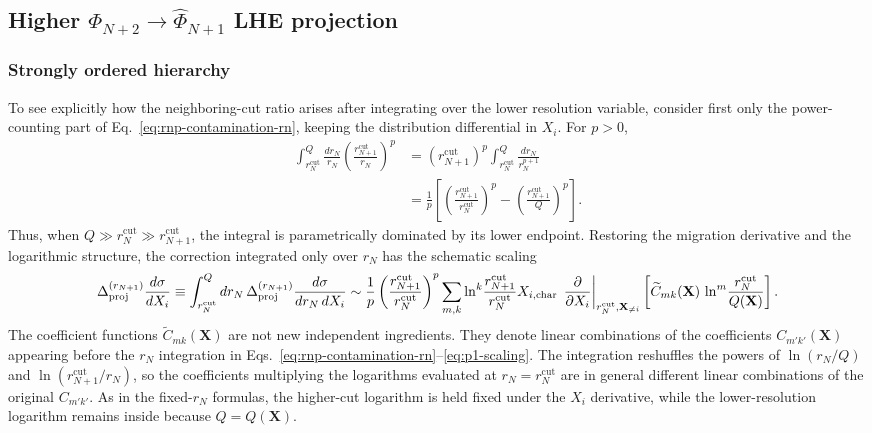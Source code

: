 \documentclass[11pt]{article}
\newcommand{\rn}{r_N}
\newcommand{\rnp}{r_{N+1}}
\newcommand{\cut}{\mathrm{cut}}
\newcommand{\Ph}{\Phi}
\begin{document}
\subsection{Higher $\Ph_{N+2}\to\widehat\Ph_{N+1}$ LHE projection}
\label{subsec:higher-projection-nnlo}

\subsubsection{Strongly ordered hierarchy}

To see explicitly how the neighboring-cut ratio arises after integrating over the lower resolution variable,
consider first only the power-counting part of Eq.~\eqref{eq:rnp-contamination-rn}, keeping the distribution
differential in \(X_i\). For \(p>0\),
\begin{align}
\int_{\rn^{\cut}}^Q
\frac{d\rn}{\rn}
\left(\frac{\rnp^{\cut}}{\rn}\right)^p
&=
(\rnp^{\cut})^p
\int_{\rn^{\cut}}^Q
\frac{d\rn}{\rn^{p+1}}
\nonumber\\
&=
\frac{1}{p}
\left[
\left(\frac{\rnp^{\cut}}{\rn^{\cut}}\right)^p
-
\left(\frac{\rnp^{\cut}}{Q}\right)^p
\right].
\label{eq:integrated-power-counting}
\end{align}
Thus, when \(Q\gg\rn^{\cut}\gg\rnp^{\cut}\), the integral is parametrically dominated by its lower endpoint.
Restoring the migration derivative and the logarithmic structure, the correction integrated only over
\(\rn\) has the schematic scaling
\begin{equation}
\Delta_{\rm proj}^{(\rnp)}
\frac{d\sigma}{dX_i}
\equiv
\int_{\rn^{\cut}}^Q d\rn\,
\Delta_{\rm proj}^{(\rnp)}
\frac{d\sigma}{d\rn\,dX_i}
\sim
\frac{1}{p}
\left(
\frac{\rnp^{\cut}}{\rn^{\cut}}
\right)^p
\sum_{m,k}
\ln^k\!\frac{\rnp^{\cut}}{\rn^{\cut}}
X_{i,\rm char}\,
\left.
\frac{\partial}{\partial X_i}
\right|_{\rn^{\cut},\mathbf X_{\neq i}}
\left[
\widetilde C_{mk}(\mathbf X)\,
\ln^m\!\frac{\rn^{\cut}}{Q(\mathbf X)}
\right].
\label{eq:integrated-ratio-scaling}
\end{equation}
The coefficient functions \(\widetilde C_{mk}(\mathbf X)\) are not new independent ingredients. They denote
linear combinations of the coefficients \(C_{m'k'}(\mathbf X)\) appearing before the \(\rn\) integration in
Eqs.~\eqref{eq:rnp-contamination-rn}--\eqref{eq:p1-scaling}. The integration reshuffles the powers of
\(\ln(\rn/Q)\) and \(\ln(\rnp^{\cut}/\rn)\), so the coefficients multiplying the logarithms evaluated at
\(\rn=\rn^{\cut}\) are in general different linear combinations of the original \(C_{m'k'}\). As in the
fixed-\(\rn\) formulas, the higher-cut logarithm is held fixed under the \(X_i\) derivative, while the
lower-resolution logarithm remains inside because \(Q=Q(\mathbf X)\).
\end{document}

